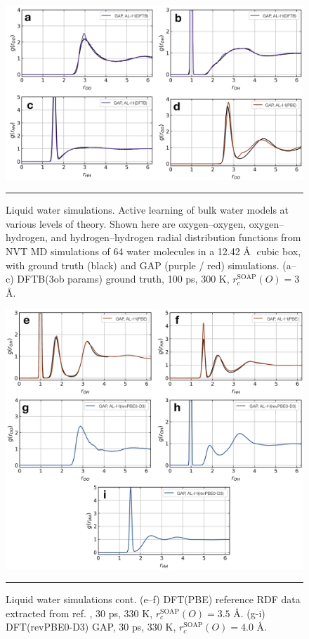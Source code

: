 \documentclass[../../main.tex]{subfiles}
\begin{document}
\begin{figure}[h!]
	\vspace{0.4cm}
	\centering
	\includegraphics[width=\textwidth]{6/gap/figs_ms/fig2a-d}
	\vspace{0.2cm}
	\hrule
	\caption{Liquid water simulations. Active learning of bulk water models at various levels of theory. Shown here are oxygen–oxygen, oxygen–hydrogen, and hydrogen–hydrogen radial distribution functions from NVT MD simulations of 64 water molecules in a 12.42 \AA$\;$ cubic box, with ground truth (black) and GAP (purple / red) simulations. (a–c) DFTB(3ob params) ground truth, 100 ps, 300 K, $r_c^\text{SOAP}(O) = 3$ \AA.}
	\label{fig::ml_2a-d}
\end{figure}
\begin{figure}[h!]
	\vspace{0.4cm}
	\centering
	\includegraphics[width=\textwidth]{6/gap/figs_ms/fig2e-i}
	\vspace{0.2cm}
	\hrule
	\caption{Liquid water simulations cont. (e–f) DFT(PBE) reference RDF data extracted from ref. \cite{Zheng2018}, 30 ps, 330 K, $r_c^\text{SOAP}(O) = 3.5$ \AA. (g-i) DFT(revPBE0-D3) GAP, 30 ps, 330 K, $r_c^\text{SOAP}(O) = 4.0$ \AA.}
	\label{fig::ml_2e-i}
\end{figure}
\end{document}

